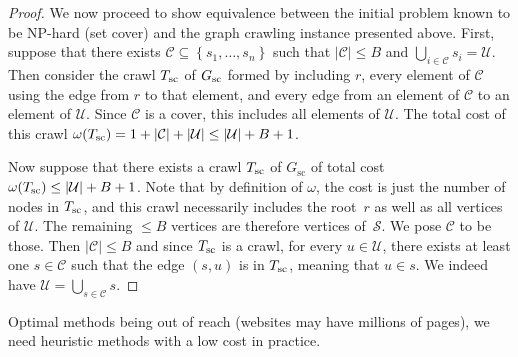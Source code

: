 \begin{proof}
	We now proceed to show equivalence between the initial problem known
	to be NP-hard (set cover) and the graph crawling instance presented
	above. First, suppose that
	there exists $\mathcal{C} \subseteq \left\{s_1, \dots,
		s_n\right\}$ such that $\left\lvert \mathcal{C} \right\rvert \leq B$
	and $\bigcup_{i \in \mathcal{C}} s_i = \mathcal{U}$.
	Then consider the crawl $T_\sc$ of $G_\sc$ formed by including
	$r$, every element of
	$\mathcal{C}$ using the edge from $r$ to that element, and every
	edge from an element of $\mathcal{C}$ to an element of $\mathcal{U}$.
	Since $\mathcal{C}$ is a cover, this includes all elements of
	$\mathcal{U}$. The total cost of this crawl
	$\omega(T_\sc)=1+|\mathcal{C}|+|\mathcal{U}|\leq |\mathcal{U}|+B+1$.

	Now suppose that there exists a crawl $T_\sc$ of $G_{\textrm{sc}}$ of
	total cost $\omega(T_\sc) \leq \left\lvert \mathcal{U} \right\rvert
		+ B + 1$. Note that by definition of $\omega$, the cost is just the
	number of nodes in $T_\sc$, and this crawl necessarily includes the
	root~$r$ as well as all vertices of $\mathcal{U}$. The remaining
	$\leq B$ vertices are therefore vertices of~$\mathcal{S}$. We pose
	$\mathcal{C}$ to be those. Then $|\mathcal{C}|\leq B$ and since
	$T_\sc$ is a crawl, for every $u\in\mathcal{U}$, there exists at
	least one $s\in\mathcal{C}$ such that the edge $(s,u)$ is in $T_\sc$,
	meaning that $u\in s$. We indeed have
	$\mathcal{U}=\bigcup_{s\in\mathcal{C}} s$.
\end{proof}
Optimal methods being out of
reach (websites may have millions of
pages),
we need heuristic methods with a low cost in practice.
